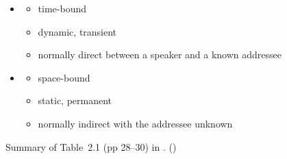 \documentclass[a4paper,landscape,headrule,footrule,xetex]{foils}
\begin{document}















\begin{itemize}
\item {}

\begin{itemize}
\item time-bound
\item dynamic, transient
\item normally direct between a speaker and a known addressee
\end{itemize}
\item {}
\begin{itemize}
\item space-bound
\item static, permanent
\item normally indirect with the addressee unknown
\end{itemize}
\end{itemize}
Summary of Table~2.1 (pp 28--30) in . ()
\end{document}
